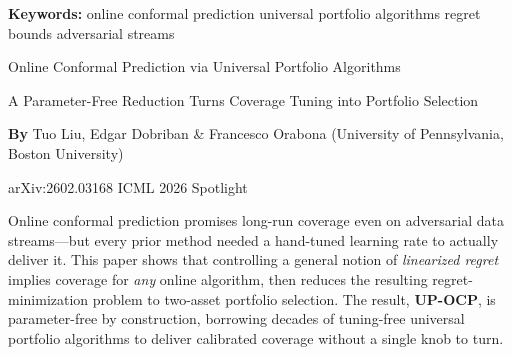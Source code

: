 \documentclass[10pt,twocolumn]{article}
\begin{document}
\setlength{\parindent}{0pt}
\setlength{\parskip}{4pt}

{\small\color{keywordgray}\textbf{Keywords:}
  online conformal prediction \textbullet{}
  universal portfolio algorithms \textbullet{}
  regret bounds \textbullet{}
  adversarial streams}\par\vspace{4pt}

{\LARGE\bfseries\raggedright
  Online Conformal Prediction via Universal Portfolio Algorithms}\par\vspace{4pt}

{\large\itshape\raggedright
  A Parameter-Free Reduction Turns Coverage Tuning into Portfolio
  Selection}\par\vspace{6pt}

{\small\textbf{By} Tuo Liu, Edgar Dobriban \& Francesco Orabona
  (University of Pennsylvania, Boston University)}\par\vspace{2pt}

{\small\color{keywordgray}arXiv:2602.03168 \textbullet{}
  ICML 2026 Spotlight}
\par\vspace{2pt}\noindent{\color{rulered}\rule{\columnwidth}{0.6pt}}\vspace{6pt}

Online conformal prediction promises long-run coverage even on
adversarial data streams---but every prior method needed a hand-tuned
learning rate to actually deliver it. This paper shows that controlling
a general notion of \emph{linearized regret} implies coverage for
\emph{any} online algorithm, then reduces the resulting regret-minimization
problem to two-asset portfolio selection. The result, \textbf{UP-OCP}, is
parameter-free by construction, borrowing decades of tuning-free universal
portfolio algorithms to deliver calibrated coverage without a single
knob to turn.
\end{document}
